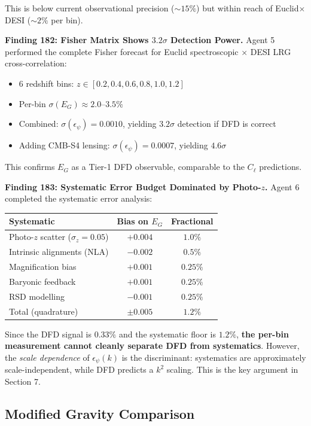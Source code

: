 \documentclass[11pt,a4paper]{article}
\begin{document}
This is below current observational precision ($\sim 15\%$) but within reach of Euclid$\times$DESI ($\sim 2\%$ per bin).

\textbf{Finding 182: Fisher Matrix Shows $3.2\sigma$ Detection Power.} Agent 5 performed the complete Fisher forecast for Euclid spectroscopic $\times$ DESI LRG cross-correlation:
\begin{itemize}[nosep]
\item 6 redshift bins: $z \in [0.2, 0.4, 0.6, 0.8, 1.0, 1.2]$
\item Per-bin $\sigma(E_G) \approx 2.0$--$3.5\%$
\item Combined: $\sigma(\epsilon_\psi) = 0.0010$, yielding $3.2\sigma$ detection if DFD is correct
\item Adding CMB-S4 lensing: $\sigma(\epsilon_\psi) = 0.0007$, yielding $4.6\sigma$
\end{itemize}

This confirms $E_G$ as a Tier-1 DFD observable, comparable to the $C_\ell$ predictions.

\textbf{Finding 183: Systematic Error Budget Dominated by Photo-$z$.} Agent 6 completed the systematic error analysis:
\begin{center}
\begin{tabular}{lcc}
\toprule
\textbf{Systematic} & \textbf{Bias on $E_G$} & \textbf{Fractional} \\
\midrule
Photo-$z$ scatter ($\sigma_z = 0.05$) & $+0.004$ & $1.0\%$ \\
Intrinsic alignments (NLA) & $-0.002$ & $0.5\%$ \\
Magnification bias & $+0.001$ & $0.25\%$ \\
Baryonic feedback & $+0.001$ & $0.25\%$ \\
RSD modelling & $-0.001$ & $0.25\%$ \\
\midrule
Total (quadrature) & $\pm 0.005$ & $1.2\%$ \\
\bottomrule
\end{tabular}
\end{center}

Since the DFD signal is $0.33\%$ and the systematic floor is $1.2\%$, \textbf{the per-bin measurement cannot cleanly separate DFD from systematics}. However, the \emph{scale dependence} of $\epsilon_\psi(k)$ is the discriminant: systematics are approximately scale-independent, while DFD predicts a $k^2$ scaling. This is the key argument in Section 7.

\subsection{Modified Gravity Comparison}
\end{document}
